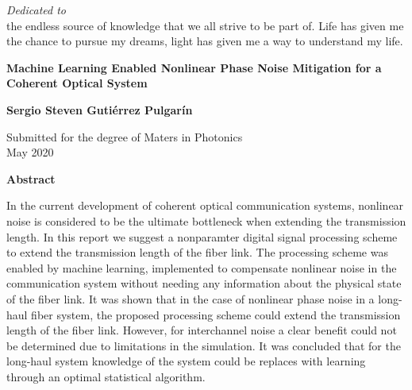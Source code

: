 \newpage
{}

\thispagestyle{empty}
\begin{center}
 \vspace*{2cm}
  \textit{\LARGE {Dedicated to}}\\ 
the endless source of knowledge that we all strive to be part of. Life has given me the chance to pursue my dreams, light has given me a way to understand my life. 



\end{center}


\newpage
\thispagestyle{empty}
\begin{center}
  \textbf{\large Machine Learning Enabled Nonlinear Phase Noise Mitigation for a Coherent Optical System}

  \vspace*{1cm}
  \textbf{\normalsize Sergio Steven Guti\'errez Pulgar\'in}

  \vspace*{0.5cm}
  {\normalsize Submitted for the degree of Maters in Photonics\\ May 2020}

  \vspace*{1cm}
  \textbf{\large Abstract}
\end{center}

In the current development of coherent optical communication systems, nonlinear noise is considered to be the ultimate bottleneck when extending the transmission length. In this report we suggest a nonparamter digital signal processing scheme to extend the transmission length of the fiber link. The processing scheme was enabled by machine learning,  implemented to compensate nonlinear noise in the communication system without needing any information about the physical state of the fiber link. It was shown that in the case of nonlinear phase noise in a long-haul fiber system, the proposed processing scheme could extend the transmission length of the fiber link. However, for interchannel noise a clear benefit could not be determined due to limitations in the simulation. It was concluded that for the long-haul system knowledge of the system could be replaces with learning through an optimal statistical algorithm. 


